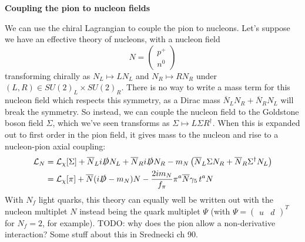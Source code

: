 \documentclass[11pt, oneside]{article}   	%
\theoremstyle{definition}
\numberwithin{equation}{subsection}		%
\newenvironment{answer}{\begin{center}\begin{answerbox}}{\end{answerbox}\end{center}}
\begin{document}
\begin{answer}
\textbf{Coupling the pion to nucleon fields}

\begin{flushleft} \setlength{\parindent}{2em}
We can use the chiral Lagrangian to couple the pion to nucleons. Let's suppose we have an effective theory of nucleons, with a nucleon field 
\begin{equation}
	N = \begin{pmatrix} p^+ \\ n^0 \end{pmatrix}
\end{equation}
transforming chirally as $N_L\mapsto L N_L$ and $N_R\mapsto R N_R$ under $(L, R)\in SU(2)_L\times SU(2)_R$. There is no way to write 
a mass term for this nucleon field which respects this symmetry, as a Dirac mass $\overline N_L N_R + \overline N_R N_L$ will break the 
symmetry. So instead, we can couple the nucleon field to the Goldstone boson field $\Sigma$, which we've seen transforms as 
$\Sigma\mapsto L\Sigma R^\dagger$. When this is expanded out to first order in the pion field, it gives mass to the nucleon and rise to a 
nucleon-pion axial coupling:
\begin{align}
	\mathcal L_N &= \mathcal L_\chi[\Sigma] + \overline N_L i\slashed D N_L + \overline N_R i\slashed D N_R - m_N\left(\overline N_L \Sigma N_R + \overline N_R 
	\Sigma^\dagger N_L\right) \\
	&= \mathcal L_\chi[\pi] + \overline N (i\slashed D - m_N) N - \frac{2 i m_N}{f_\pi} \pi^a \overline N \gamma_5 \,t^a N
\end{align}
With $N_f$ light quarks, this theory can equally well be written out with the nucleon multiplet $N$ instead being the quark multiplet $\Psi$ 
(with $\Psi = \begin{pmatrix} u & d \end{pmatrix}^T$ for $N_f = 2$, for example). 
{\color{red} TODO: why does the pion allow a non-derivative interaction? Some stuff about this in Srednecki ch 90.}
\end{flushleft}
\end{answer}
\end{document}
